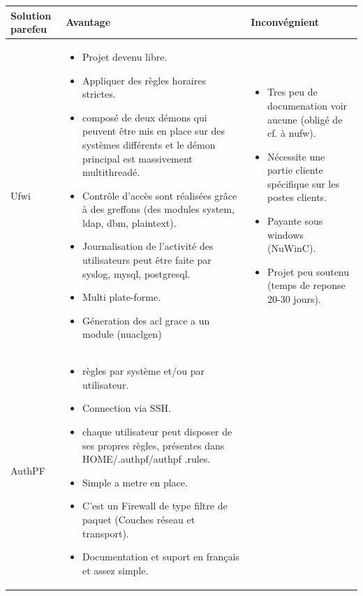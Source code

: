 \documentclass[12pt]{report}
\begin{document}
\begin{itemize}
\begin{itemize}
  \end{itemize}
\begin{longtable}{|p{4cm}|p{6cm}|p{6cm}|}
  \hline
  \textbf{Solution parefeu} & \textbf{Avantage} & \textbf{Inconvégnient}\\
  \hline
    Ufwi &
     \begin{itemize}
        \item Projet devenu libre.
        \item Appliquer des règles horaires strictes.
        \item  composé de deux démons qui peuvent être mis en place sur des systèmes différents et le démon principal est massivement multithreadé.
        \item Contrôle d’accès sont réalisées grâce à des greffons (des modules system, ldap, dbm, plaintext).
        \item Journalisation de l’activité des utilisateurs peut être faite par syslog, mysql, postgresql.
        \item Multi plate-forme.
        \item Géneration des acl grace a un module (nuaclgen)
    \end{itemize}&
    \begin{itemize}
        \item Tres peu de documenation voir aucune (obligé de cf. à nufw).
        \item Nécessite une partie cliente spécifique sur les postes clients.
        \item Payante sous windows (NuWinC).
        \item Projet peu soutenu (temps de reponse 20-30 jours).
    \end{itemize} \\
  \hline
    AuthPF&
    \begin{itemize}
        \item règles par système et/ou par utilisateur.
        \item Connection via SSH.
        \item chaque utilisateur peut disposer de ses propres règles, présentes dans HOME/.authpf/authpf .rules.
        \item Simple a metre en place.
        \item  C'est un Firewall de type filtre de paquet (Couches réseau et transport).
        \item Documentation et suport en français et assez simple.
    \end{itemize}&
    \begin{itemize}

\end{itemize}
\end{longtable}
\end{itemize}
\end{document}
